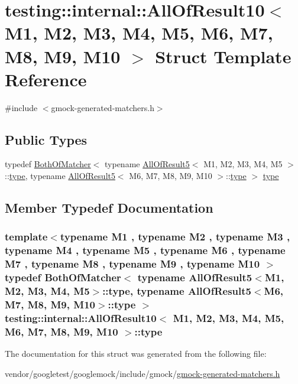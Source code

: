 \hypertarget{structtesting_1_1internal_1_1AllOfResult10}{}\section{testing\+:\+:internal\+:\+:All\+Of\+Result10$<$ M1, M2, M3, M4, M5, M6, M7, M8, M9, M10 $>$ Struct Template Reference}
\label{structtesting_1_1internal_1_1AllOfResult10}


{\ttfamily \#include $<$gmock-\/generated-\/matchers.\+h$>$}

\subsection*{Public Types}
\begin{DoxyCompactItemize}
\item 
typedef \hyperlink{classtesting_1_1internal_1_1BothOfMatcher}{Both\+Of\+Matcher}$<$ typename \hyperlink{structtesting_1_1internal_1_1AllOfResult5}{All\+Of\+Result5}$<$ M1, M2, M3, M4, M5 $>$\+::\hyperlink{structtesting_1_1internal_1_1AllOfResult10_a48d6c6de6d0d5445b212119e1f536af5}{type}, typename \hyperlink{structtesting_1_1internal_1_1AllOfResult5}{All\+Of\+Result5}$<$ M6, M7, M8, M9, M10 $>$\+::\hyperlink{structtesting_1_1internal_1_1AllOfResult10_a48d6c6de6d0d5445b212119e1f536af5}{type} $>$ \hyperlink{structtesting_1_1internal_1_1AllOfResult10_a48d6c6de6d0d5445b212119e1f536af5}{type}
\end{DoxyCompactItemize}


\subsection{Member Typedef Documentation}
\subsubsection[{\texorpdfstring{type}{type}}]{\setlength{\rightskip}{0pt plus 5cm}template$<$typename M1 , typename M2 , typename M3 , typename M4 , typename M5 , typename M6 , typename M7 , typename M8 , typename M9 , typename M10 $>$ typedef {\bf Both\+Of\+Matcher}$<$ typename {\bf All\+Of\+Result5}$<$M1, M2, M3, M4, M5$>$\+::{\bf type}, typename {\bf All\+Of\+Result5}$<$M6, M7, M8, M9, M10$>$\+::{\bf type} $>$ {\bf testing\+::internal\+::\+All\+Of\+Result10}$<$ M1, M2, M3, M4, M5, M6, M7, M8, M9, M10 $>$\+::{\bf type}}\hypertarget{structtesting_1_1internal_1_1AllOfResult10_a48d6c6de6d0d5445b212119e1f536af5}{}\label{structtesting_1_1internal_1_1AllOfResult10_a48d6c6de6d0d5445b212119e1f536af5}


The documentation for this struct was generated from the following file\+:\begin{DoxyCompactItemize}
\item 
vendor/googletest/googlemock/include/gmock/\hyperlink{gmock-generated-matchers_8h}{gmock-\/generated-\/matchers.\+h}\end{DoxyCompactItemize}
